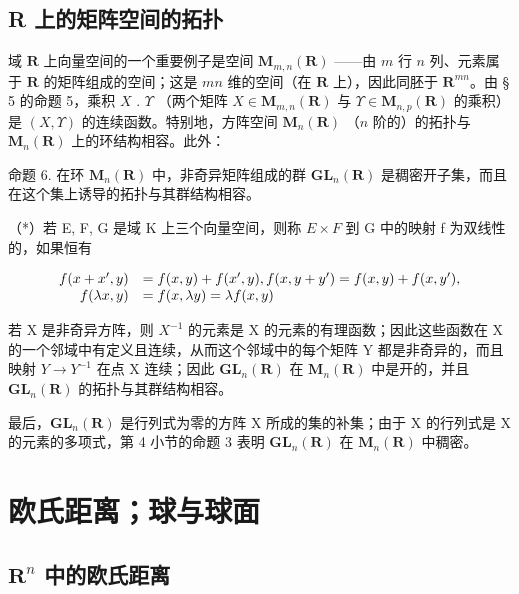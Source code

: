 \subsection{R 上的矩阵空间的拓扑}

域 \(\mathbf{R}\) 上向量空间的一个重要例子是空间 \(\mathbf{M}_{m,n}(\mathbf{R})\) ——由 \(m\) 行 \(n\) 列、元素属于 \(\mathbf{R}\) 的矩阵组成的空间；这是 \(mn\) 维的空间（在 \(\mathbf{R}\) 上），因此同胚于 \(\mathbf{R}^{mn}\)。由 § 5 的命题 5，乘积 \(X\) . \(\Upsilon\) （两个矩阵 \(X \in \mathbf{M}_{m,n}(\mathbf{R})\) 与 \(\Upsilon \in \mathbf{M}_{n,p}(\mathbf{R})\) 的乘积）是 \((X, \Upsilon)\) 的连续函数。特别地，方阵空间 \(\mathbf{M}_n(\mathbf{R})\) （\(n\) 阶的）的拓扑与 \(\mathbf{M}_n(\mathbf{R})\) 上的环结构相容。此外：

命题 6. 在环 \(\mathbf{M}_n(\mathbf{R})\) 中，非奇异矩阵组成的群 \(\mathbf{GL}_n(\mathbf{R})\) 是稠密开子集，而且在这个集上诱导的拓扑与其群结构相容。

（*）若 E, F, G 是域 K 上三个向量空间，则称 \(E \times F\) 到 G 中的映射 f 为双线性的，如果恒有

\[
\begin{array}{r l} f (x + x ^ {\prime}, y) & = f (x, y) + f (x ^ {\prime}, y), f (x, y + y ^ {\prime}) = f (x, y) + f (x, y ^ {\prime}), \\ f (\lambda x, y) & = f (x, \lambda y) = \lambda f (x, y) \end{array}
\]

若 X 是非奇异方阵，则 \(X^{-1}\) 的元素是 X 的元素的有理函数；因此这些函数在 X 的一个邻域中有定义且连续，从而这个邻域中的每个矩阵 Y 都是非奇异的，而且映射 \(Y \to Y^{-1}\) 在点 X 连续；因此 \(\mathbf{GL}_{n}(\mathbf{R})\) 在 \(\mathbf{M}_{n}(\mathbf{R})\) 中是开的，并且 \(\mathbf{GL}_{n}(\mathbf{R})\) 的拓扑与其群结构相容。

最后，\(\mathbf{GL}_{n}(\mathbf{R})\) 是行列式为零的方阵 X 所成的集的补集；由于 X 的行列式是 X 的元素的多项式，第 4 小节的命题 3 表明 \(\mathbf{GL}_{n}(\mathbf{R})\) 在 \(\mathbf{M}_{n}(\mathbf{R})\) 中稠密。

\section{欧氏距离；球与球面}

\subsection{\texorpdfstring{\(\mathbf{R}^n\) 中的欧氏距离}{R 的 n 次幂中的欧氏距离}}

